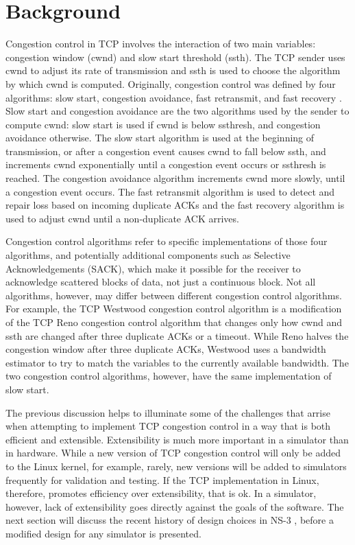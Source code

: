 \documentclass[conference]{IEEEtran}
\begin{document}
\section{Background}

Congestion control in TCP involves the interaction of two main variables: congestion window (cwnd) and slow start threshold (ssth). The TCP sender uses cwnd to adjust its rate of transmission and ssth is used to choose the algorithm by which cwnd is computed. Originally, congestion control was defined by four algorithms: slow start, congestion avoidance, fast retransmit, and fast recovery \cite{RFC5681}. Slow start and congestion avoidance are the two algorithms used by the sender to compute cwnd: slow start is used if cwnd is below ssthresh, and congestion avoidance otherwise. The slow start algorithm is used at the beginning of transmission, or after a congestion event causes cwnd to fall below ssth, and increments cwnd exponentially until a congestion event occurs or ssthresh is reached. The congestion avoidance algorithm increments cwnd more slowly, until a congestion event occurs. The fast retransmit algorithm is used to detect and repair loss based on incoming duplicate ACKs and the fast recovery algorithm is used to adjust cwnd until a non-duplicate ACK arrives. 

Congestion control algorithms refer to specific implementations of those four algorithms, and potentially additional components such as Selective Acknowledgements (SACK), which make it possible for the receiver to acknowledge scattered blocks of data, not just a continuous block. Not all algorithms, however, may differ between different congestion control algorithms. For example, the TCP Westwood \cite{WW} congestion control algorithm is a modification of the TCP Reno congestion control algorithm that changes only how cwnd and ssth are changed after three duplicate ACKs or a timeout. While Reno halves the congestion window after three duplicate ACKs, Westwood uses a bandwidth estimator to try to match the variables to the currently available bandwidth. The two congestion control algorithms, however, have the same implementation of slow start. 

The previous discussion helps to illuminate some of the challenges that arrise when attempting to implement TCP congestion control in a way that is both efficient and extensible. Extensibility is much more important in a simulator than in hardware. While a new version of TCP congestion control will only be added to the Linux kernel, for example, rarely, new versions will be added to simulators frequently for validation and testing. If the TCP implementation in Linux, therefore, promotes efficiency over extensibility, that is ok. In a simulator, however, lack of extensibility goes directly against the goals of the software. The next section will discuss the recent history of design choices in NS-3 , before a modified design for any simulator is presented. 
\end{document}

